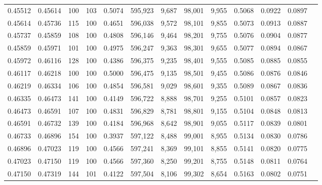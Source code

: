 \begin{tabular}{rrrrrrrrrrrrr}
0.45512 & 0.45614 &   100 & 103 &                                     0.5074 & 595,923 &   9,687 &  98,001 &   9,955 & 0.5068 & 0.0922 & 0.0897 \\
0.45614 & 0.45736 &   115 & 100 &                                     0.4651 & 596,038 &   9,572 &  98,101 &   9,855 & 0.5073 & 0.0913 & 0.0887 \\
0.45737 & 0.45859 &   108 & 100 &                                     0.4808 & 596,146 &   9,464 &  98,201 &   9,755 & 0.5076 & 0.0904 & 0.0877 \\
0.45859 & 0.45971 &   101 & 100 &                                     0.4975 & 596,247 &   9,363 &  98,301 &   9,655 & 0.5077 & 0.0894 & 0.0867 \\
0.45972 & 0.46116 &   128 & 100 &                                     0.4386 & 596,375 &   9,235 &  98,401 &   9,555 & 0.5085 & 0.0885 & 0.0855 \\
0.46117 & 0.46218 &   100 & 100 &                                     0.5000 & 596,475 &   9,135 &  98,501 &   9,455 & 0.5086 & 0.0876 & 0.0846 \\
0.46219 & 0.46334 &   106 & 100 &                                     0.4854 & 596,581 &   9,029 &  98,601 &   9,355 & 0.5089 & 0.0867 & 0.0836 \\
0.46335 & 0.46473 &   141 & 100 &                                     0.4149 & 596,722 &   8,888 &  98,701 &   9,255 & 0.5101 & 0.0857 & 0.0823 \\
0.46473 & 0.46591 &   107 & 100 &                                     0.4831 & 596,829 &   8,781 &  98,801 &   9,155 & 0.5104 & 0.0848 & 0.0813 \\
0.46591 & 0.46732 &   139 & 100 &                                     0.4184 & 596,968 &   8,642 &  98,901 &   9,055 & 0.5117 & 0.0839 & 0.0801 \\
0.46733 & 0.46896 &   154 & 100 &                                     0.3937 & 597,122 &   8,488 &  99,001 &   8,955 & 0.5134 & 0.0830 & 0.0786 \\
0.46896 & 0.47023 &   119 & 100 &                                     0.4566 & 597,241 &   8,369 &  99,101 &   8,855 & 0.5141 & 0.0820 & 0.0775 \\
0.47023 & 0.47150 &   119 & 100 &                                     0.4566 & 597,360 &   8,250 &  99,201 &   8,755 & 0.5148 & 0.0811 & 0.0764 \\
0.47150 & 0.47319 &   144 & 101 &                                     0.4122 & 597,504 &   8,106 &  99,302 &   8,654 & 0.5163 & 0.0802 & 0.0751 \\

\end{tabular}
